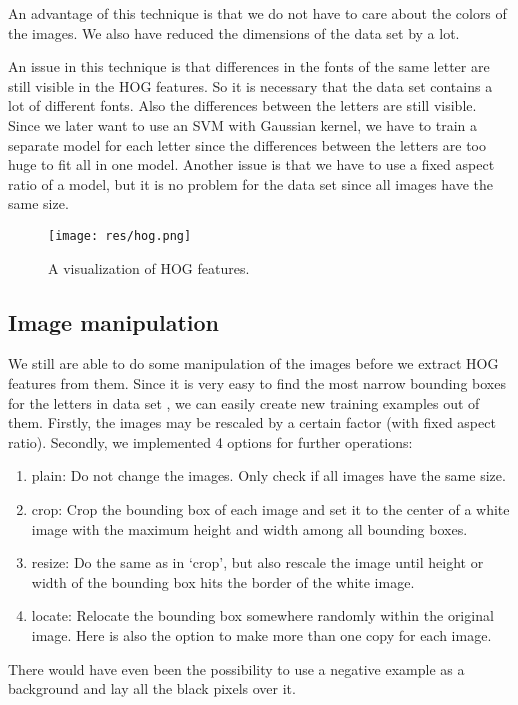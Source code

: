 \documentclass[conference]{IEEEtran}
\begin{document}
An advantage of this technique is that we do not have to care about the colors of the images. We also have reduced the dimensions of the data set by a lot.

An issue in this technique is that differences in the fonts of the same letter are still visible in the HOG features. So it is necessary that the data set \cite{bib:chars74k} contains a lot of different fonts. Also the differences between the letters are still visible. Since we later want to use an SVM with Gaussian kernel, we have to train a separate model for each letter since the differences  between the letters are too huge to fit all in one model. Another issue is that we have to use a fixed aspect ratio of a model, but it is no problem for the data set \cite{bib:chars74k} since all images have the same size.

\begin{figure}[htbp]
\centerline{\texttt{[image: res/hog.png]}}
\caption{A visualization of HOG features.}
\label{fig:hog}
\end{figure}

\subsection{Image manipulation}

We still are able to do some manipulation of the images before we extract HOG features from them. Since it is very easy to find the most narrow bounding boxes for the letters in data set \cite{bib:chars74k}, we can easily create new training examples out of them. Firstly, the images may be rescaled by a certain factor (with fixed aspect ratio). Secondly, we implemented 4 options for further operations:
\begin{enumerate}
\item plain: Do not change the images. Only check if all images have the same size.
\item crop: Crop the bounding box of each image and set it to the center of a white image with the maximum height and width among all bounding boxes.
\item resize: Do the same as in `crop', but also rescale the image until height or width of the bounding box hits the border of the white image.
\item locate: Relocate the bounding box somewhere randomly within the original image. Here is also the option to make more than one copy for each image.
\end{enumerate}
There would have even been the possibility to use a negative example as a background and lay all the black pixels over it. \\[-5pt]
\end{document}
